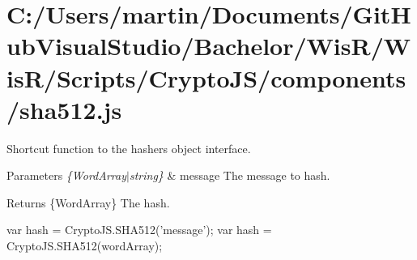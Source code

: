 \hypertarget{_c_1_2_users_2martin_2_documents_2_git_hub_visual_studio_2_bachelor_2_wis_r_2_wis_r_2_scripts_2_dc99dd62c551a04a8040b24e4d0ebeb3}{}\section{C\+:/\+Users/martin/\+Documents/\+Git\+Hub\+Visual\+Studio/\+Bachelor/\+Wis\+R/\+Wis\+R/\+Scripts/\+Crypto\+J\+S/components/sha512.\+js}
Shortcut function to the hasher\textquotesingle{}s object interface.


\begin{DoxyParams}{Parameters}
{\em \{\+Word\+Array$\vert$string\}} & message The message to hash.\\
\hline
\end{DoxyParams}
\begin{DoxyReturn}{Returns}
\{Word\+Array\} The hash.
\end{DoxyReturn}
\begin{DoxyVerb}var hash = CryptoJS.SHA512('message');
var hash = CryptoJS.SHA512(wordArray);\end{DoxyVerb}



